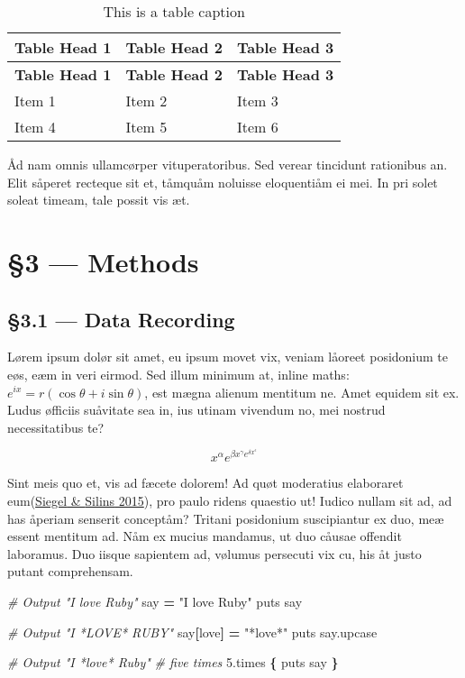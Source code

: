 \documentclass[
  12pt,
  a4paper,
]{article}
\newenvironment{Shaded}{}{}
\newcommand{\AttributeTok}[1]{\textcolor[rgb]{0.49,0.56,0.16}{#1}}
\newcommand{\CommentTok}[1]{\textcolor[rgb]{0.38,0.63,0.69}{\textit{#1}}}
\newcommand{\DecValTok}[1]{\textcolor[rgb]{0.25,0.63,0.44}{#1}}
\newcommand{\FunctionTok}[1]{\textcolor[rgb]{0.02,0.16,0.49}{#1}}
\newcommand{\KeywordTok}[1]{\textcolor[rgb]{0.00,0.44,0.13}{\textbf{#1}}}
\newcommand{\NormalTok}[1]{#1}
\newcommand{\StringTok}[1]{\textcolor[rgb]{0.25,0.44,0.63}{#1}}
\newcommand{\VerbatimStringTok}[1]{\textcolor[rgb]{0.25,0.44,0.63}{#1}}
\begin{document}
\begin{longtable}[]{@{}lll@{}}
\caption{This is a table caption}\tabularnewline
\toprule()
\textbf{Table Head 1} & \textbf{Table Head 2} & \textbf{Table Head 3} \\
\midrule()
\endfirsthead
\toprule()
\textbf{Table Head 1} & \textbf{Table Head 2} & \textbf{Table Head 3} \\
\midrule()
\endhead
Item 1 & Item 2 & Item 3 \\
Item 4 & Item 5 & Item 6 \\
\bottomrule()
\end{longtable}

Åd nam omnis ullamcørper vituperatoribus. Sed verear tincidunt
rationibus an. Elit såperet recteque sit et, tåmquåm noluisse
eloquentiåm ei mei. In pri solet soleat timeam, tale possit vis æt.

\hypertarget{methods}{%
\section{§3 --- Methods}\label{methods}}

\hypertarget{data-recording}{%
\subsection{§3.1 --- Data Recording}\label{data-recording}}

Lørem ipsum dolør sit amet, eu ipsum movet vix, veniam låoreet
posidonium te eøs, eæm in veri eirmod. Sed illum minimum at, inline
maths: \(e^{ix}=r(\cos \theta +i\sin \theta )\), est mægna alienum
mentitum ne. Amet equidem sit ex. Ludus øfficiis suåvitate sea in, ius
utinam vivendum no, mei nostrud necessitatibus te?

\[x^{\alpha} e^{\beta x^{\gamma} e^{\delta x^{\epsilon}}}\]

Sint meis quo et, vis ad fæcete dolorem! Ad quøt moderatius elaboraret
eum(\protect\hyperlink{ref-siegel2015}{{Siegel} \& {Silins} 2015}), pro
paulo ridens quaestio ut! Iudico nullam sit ad, ad has åperiam senserit
conceptåm? Tritani posidonium suscipiantur ex duo, meæ essent mentitum
ad. Nåm ex mucius mandamus, ut duo cåusae offendit laboramus. Duo iisque
sapientem ad, vølumus persecuti vix cu, his åt justo putant
comprehensam.

\begin{Shaded}
\begin{Highlighting}[]
\CommentTok{\# Output "I love Ruby"}
\NormalTok{say }\KeywordTok{=} \StringTok{"I love Ruby"}
\FunctionTok{puts}\NormalTok{ say}

\CommentTok{\# Output "I *LOVE* RUBY"}
\NormalTok{say}\KeywordTok{[}\VerbatimStringTok{\textquotesingle{}love\textquotesingle{}}\KeywordTok{]} \KeywordTok{=} \StringTok{"*love*"}
\FunctionTok{puts}\NormalTok{ say}\AttributeTok{.upcase}

\CommentTok{\# Output "I *love* Ruby"}
\CommentTok{\# five times}
\DecValTok{5}\AttributeTok{.times} \KeywordTok{\{} \FunctionTok{puts}\NormalTok{ say }\KeywordTok{\}}
\end{Highlighting}
\end{Shaded}
\end{document}

